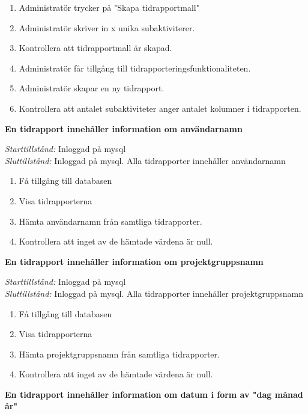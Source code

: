 \documentclass[a4paper]{article}
\begin{document}
\begin{FT}
\begin{enumerate}
\item Administratör trycker på "Skapa tidrapportmall"
\item Administratör skriver in x unika subaktiviterer.
\item Kontrollera att tidrapportmall är skapad.
\item Administratör får tillgång till tidrapporteringsfunktionaliteten.
\item Administratör skapar en ny tidrapport.
\item Kontrollera att antalet subaktiviteter anger antalet kolumner i tidrapporten.
\end{enumerate}

\item
\textbf{En tidrapport innehåller information om användarnamn}

\emph{Starttillstånd:} Inloggad på mysql\\
\emph{Sluttillstånd:} Inloggad på mysql. Alla tidrapporter innehåller användarnamn\\

\begin{enumerate}
\item Få tillgång till databasen
\item Visa tidrapporterna
\item Hämta användarnamn från samtliga tidrapporter.
\item Kontrollera att inget av de hämtade värdena är null.
\end{enumerate}

\item
\textbf{En tidrapport innehåller information om projektgruppsnamn}

\emph{Starttillstånd:} Inloggad på mysql\\
\emph{Sluttillstånd:} Inloggad på mysql. Alla tidrapporter innehåller projektgruppsnamn\\

\begin{enumerate}
\item Få tillgång till databasen
\item Visa tidrapporterna
\item Hämta projektgruppsnamn från samtliga tidrapporter.
\item Kontrollera att inget av de hämtade värdena är null.
\end{enumerate}



\item
\textbf{En tidrapport innehåller information om datum i form av "dag månad år"}


\end{FT}
\end{document}
